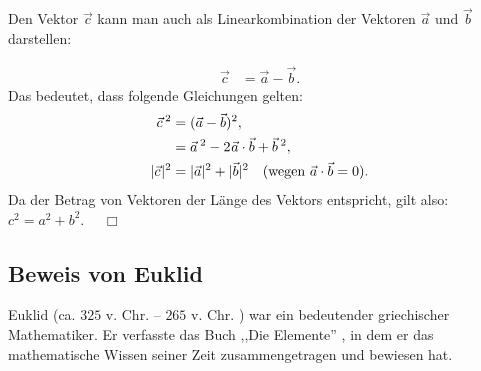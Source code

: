 \documentclass[a4paper,12pt]{article}
\begin{document}
Den Vektor $\vec{c}$ kann man auch als Linearkombination der Vektoren $\vec{a}$ und $\vec{b}$ darstellen:

\begin{align*}
\vec{c} &= \vec{a} - \vec{b}.
\end{align*}
Das bedeutet, dass folgende Gleichungen gelten:
\begin{align*}
\vec{c}^{\:2} &= (\vec{a} - \vec{b})^2, \\
&= \vec{a}^{\:2} - 2\mkern 1mu\vec{a} \cdot \vec{b} + \vec{b}^{\:2}, \\
|\vec{c}\mkern 1mu|^2 &= |\vec{a}|^2 + |\vec{b}|^2 \quad \text{(wegen $\vec{a} \cdot \vec{b} = 0$)}.
\end{align*}
Da der Betrag von Vektoren der Länge des Vektors entspricht, gilt also: $c^2 = a^2 + b^2$. $\quad\Box$

\subsection{Beweis von Euklid}
Euklid (ca. $325$ v. Chr. -- $265$ v. Chr. \cite{Euklid3}) war ein bedeutender griechischer Mathematiker. Er verfasste das Buch ,,Die Elemente'' \cite{Euklid2}, in dem er das mathematische Wissen seiner Zeit zusammengetragen und bewiesen hat.
\end{document}
